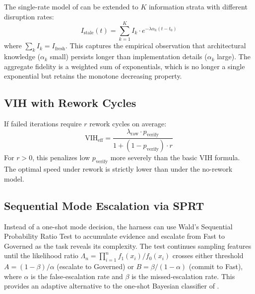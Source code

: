 \documentclass[11pt, a4paper, copyright]{googledeepmind}
\newcommand{\VIH}{\mathrm{VIH}}
\begin{document}
\begin{appendices}
The single-rate model of  can be extended to $K$ information strata with different disruption rates:
\[
    I_{\mathrm{stale}}(t) = \sum_{k=1}^K I_k \cdot e^{-\lambda\alpha_k(t - t_0)}
\]
where $\sum_k I_k = I_{\mathrm{fresh}}$. This captures the empirical observation that architectural knowledge ($\alpha_k$ small) persists longer than implementation details ($\alpha_k$ large). The aggregate fidelity is a weighted sum of exponentials, which is no longer a single exponential but retains the monotone decreasing property.

\subsection{VIH with Rework Cycles}

If failed iterations require $r$ rework cycles on average:
\[
    \VIH_{\mathrm{eff}} = \frac{\lambda_{\mathrm{raw}} \cdot p_{\mathrm{verify}}}{1 + (1 - p_{\mathrm{verify}}) \cdot r}
\]
For $r > 0$, this penalizes low $p_{\mathrm{verify}}$ more severely than the basic VIH formula. The optimal speed under rework is strictly lower than under the no-rework model.

\subsection{Sequential Mode Escalation via SPRT}

Instead of a one-shot mode decision, the harness can use Wald's Sequential Probability Ratio Test to accumulate evidence and escalate from Fast to Governed as the task reveals its complexity. The test continues sampling features until the likelihood ratio $\Lambda_n = \prod_{i=1}^n f_1(x_i)/f_0(x_i)$ crosses either threshold $A = (1 - \beta)/\alpha$ (escalate to Governed) or $B = \beta/(1-\alpha)$ (commit to Fast), where $\alpha$ is the false-escalation rate and $\beta$ is the missed-escalation rate. This provides an adaptive alternative to the one-shot Bayesian classifier of .

\end{appendices}



\end{document}
